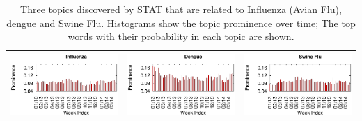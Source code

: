 \documentclass[conference]{IEEEtran}
\newcommand{\model}{{STAT}\xspace} %
\begin{document}
\begin{table}[t]
\begin{center}
\caption{Three topics discovered by \model that are related to Influenza (Avian Flu), dengue and Swine Flu. Histograms show the topic prominence over time; The top words with their probability in each topic are shown.}
\large{
\begin{tabular}{|lr|lr|lr|}
\hline
\multicolumn{2}{|c|}{\includegraphics[clip,scale=0.45]{fig/topic_influenza_timeline.eps}} & \multicolumn{2}{|c|}{\includegraphics[clip,scale=0.45]{fig/topic_dengue_timeline.eps}}& 
\multicolumn{2}{|c|}{\includegraphics[clip,scale=0.45]{fig/topic_swine_timeline.eps}} \\ \hline

\end{tabular}}
\end{center}
\end{table}
\end{document}
